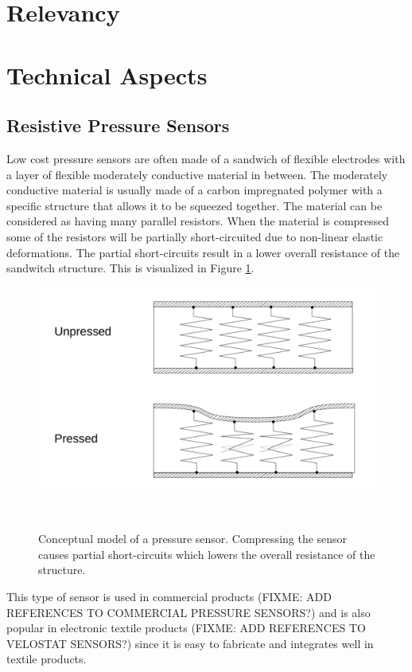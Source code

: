 \documentclass{sigchi}
\begin{document}
\section{Relevancy}

\section{Technical Aspects}
\subsection{Resistive Pressure Sensors}
Low cost pressure sensors are often made of a sandwich of flexible electrodes
with a layer of flexible moderately conductive material in between. The
moderately conductive material is usually made of a carbon impregnated polymer
with a specific structure that allows it to be squeezed together. The material
can be considered as having many parallel resistors. When the material is
compressed some of the resistors will be partially short-circuited due to
non-linear elastic deformations. The partial short-circuits result in a lower
overall resistance of the sandwitch structure. This is visualized
in Figure \ref{fig:pressure_sensor}.

\begin{figure}[!htbp]
\centering
  \includegraphics[width=0.9\columnwidth]{figures/resistive_sensor}
  \caption{Conceptual model of a pressure sensor. Compressing the sensor causes
  partial short-circuits which lowers the overall resistance of the
  structure.}~\label{fig:pressure_sensor}
\end{figure}

This type of sensor is used in commercial products (FIXME: ADD REFERENCES TO
COMMERCIAL PRESSURE SENSORS?) and is also popular in electronic textile products
(FIXME: ADD REFERENCES TO VELOSTAT SENSORS?) since it is easy to fabricate and
integrates well in textile products.
\end{document}
